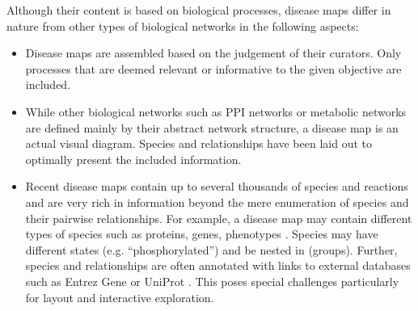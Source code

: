 \documentclass[
	fontsize=10pt, %
	twoside=false, %
	secnumdepth=1, %
  toc=indentunnumbered %
]{kaobook}
\begin{document}
Although their content is based on biological processes, disease maps differ in
nature from other types of biological networks in the following aspects:
\begin{itemize}
\item Disease maps are assembled based on the judgement of their curators. Only
  processes that are deemed relevant or informative to the given objective are
  included.
\item While other biological networks such as PPI networks or metabolic networks
  are defined mainly by their abstract network structure, a disease map is an
  actual visual diagram. Species and relationships have been laid out to
  optimally present the included information.
\item
  Recent disease maps contain up to several thousands of species and reactions and
  are very rich in information beyond the mere enumeration of species and their
  pairwise relationships. For example, a disease map may contain different types
  of species such as proteins, genes, phenotypes \etc. Species may have
  different states (e.g. ``phosphorylated'') and be nested in 
  (groups). Further, species and relationships are often
  annotated with links to external databases such as Entrez Gene
  \cite{maglott_EntrezGeneGenecentered_2005} or UniProt
  \cite{theuniprotconsortium_UniProtUniversalProtein_2021}.
  This poses special challenges particularly for layout and
  interactive exploration. 
\end{itemize}


\end{document}

